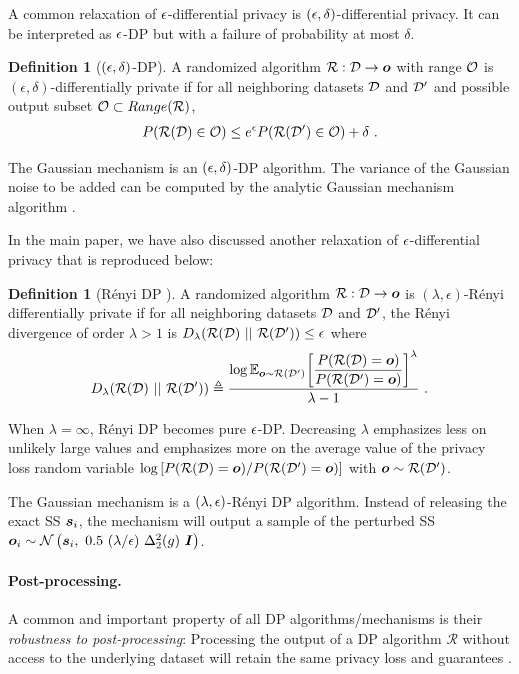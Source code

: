 \documentclass{article}
\theoremstyle{plain}
\theoremstyle{definition}
\newtheorem{definition}[theorem]{Definition}
\theoremstyle{remark}
\begin{document}
A common relaxation
of ${\epsilon}$-differential privacy is $({\epsilon}, \delta)$-differential privacy. It can be interpreted as ${\epsilon}$-DP but with a failure of probability at most $\delta$.

\begin{definition}[$({\epsilon}, \delta)$-DP]
A randomized algorithm $\mathcal{R}: {\mathcal{D}} \rightarrow {\bm{o}}$ with range ${\mathcal{O}}$ is $(\epsilon, \delta)$-differentially private if for all neighboring datasets ${\mathcal{D}}$ and ${\mathcal{D}}'$ and possible output subset ${\mathcal{O}} \subset \mathop{Range}(\mathcal{R})$,
\begin{eqnarray*}
P(\mathcal{R}({\mathcal{D}}) \in {\mathcal{O}}) \leq e^\epsilon P(\mathcal{R}({\mathcal{D}}') \in {\mathcal{O}}) + \delta\ .
\end{eqnarray*}
\end{definition}
The Gaussian mechanism is an $({\epsilon}, \delta)$-DP algorithm. The variance of the Gaussian noise to be added can be computed by the analytic Gaussian mechanism algorithm \cite{balle2018analytic-gaussian}.

In the main paper, we have also discussed another relaxation
of ${\epsilon}$-differential privacy that is reproduced below:
\begin{definition}[R{\'e}nyi DP \cite{mironov2017renyi}]
A randomized algorithm $\mathcal{R}: {\mathcal{D}} \rightarrow {\bm{o}}$ is $(\lambda, \epsilon)$-R{\'e}nyi differentially private if for all neighboring datasets ${\mathcal{D}}$ and ${\mathcal{D}}'$, the R{\'e}nyi divergence of order $\lambda > 1$ is $D_\lambda(\mathcal{R}(\gD)\ ||\ \mathcal{R}(\gD'))  
\leq \epsilon$ where
\begin{eqnarray*}
D_\lambda(\mathcal{R}({\mathcal{D}})\ ||\ \mathcal{R}({\mathcal{D}}')) \triangleq \frac{\log{\mathbb{E}_{{\bm{o}}\sim \mathcal{R}({\mathcal{D}}')}\hspace{-0.5mm}\left[\displaystyle\frac{P(\mathcal{R}({\mathcal{D}}) = {\bm{o}})}{P(\mathcal{R}({\mathcal{D}}') = {\bm{o}})}\right]^\lambda}}{\lambda-1}\ .
\end{eqnarray*}
\end{definition}
When $\lambda=\infty$, R{\'e}nyi DP becomes pure ${\epsilon}$-DP. Decreasing $\lambda$ emphasizes less on unlikely large values and emphasizes more on the average value of the privacy loss random variable $\log\left[{{P(\mathcal{R}({\mathcal{D}}) = {\bm{o}})}/{P(\mathcal{R}({\mathcal{D}}') = {\bm{o}})}}\right]$ with ${\bm{o}} \sim \mathcal{R}({\mathcal{D}}')$.

The Gaussian mechanism is a $(\lambda, {\epsilon})$-R{\'e}nyi DP algorithm. Instead of releasing the exact SS ${\bm{s}}_i$, the mechanism will output a sample of the perturbed SS
$ \vo_i \sim \mathcal{N}\left(\vs_i,\ 0.5\ ({\lambda}/{\epsilon}) \ \Delta_2^2(g)\ \boldsymbol{I} \right)$. 

\paragraph{Post-processing.} A common and important property of all DP algorithms/mechanisms is their \emph{robustness to post-processing}: Processing the output of a DP algorithm $\mathcal{R}$ without access to the underlying dataset will retain the same privacy loss and guarantees \cite{dwork2014}.
\end{document}
